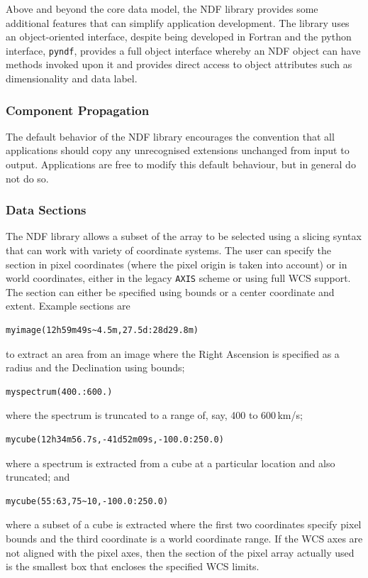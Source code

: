 \documentclass[final,authoryear,5p,times,twocolumn]{elsarticle}
\begin{document}
Above and beyond the core data model, the NDF library provides some
additional features that can simplify application development. The
library uses an object-oriented interface, despite being
developed in Fortran and the python interface, \texttt{pyndf}, provides a full object
interface whereby an NDF object can have methods invoked upon it and
provides direct access to object attributes such as dimensionality and
data label.

\subsubsection{Component Propagation}

The default behavior of the NDF library encourages the convention
that all applications should copy any unrecognised extensions
unchanged from input to output. Applications are free to modify this
default behaviour, but in general do not do so.

\subsubsection{Data Sections}

The NDF library allows a subset of the array to be selected using a
slicing syntax that can work with variety of coordinate systems. The
user can specify the section in pixel coordinates (where the pixel
origin is taken into account) or in world coordinates, either in the
legacy \texttt{AXIS} scheme or using full WCS support. The section can
either be specified using bounds or a center coordinate and
extent. Example sections are
\begin{verbatim}
myimage(12h59m49s~4.5m,27.5d:28d29.8m)
\end{verbatim}
to extract an area from an image where the Right Ascension is
specified as a radius and the Declination using bounds;
\begin{verbatim}
myspectrum(400.:600.)
\end{verbatim}
where the spectrum is truncated to a range of, say, 400 to 600\,km/s;
\begin{verbatim}
mycube(12h34m56.7s,-41d52m09s,-100.0:250.0)
\end{verbatim}
where a spectrum is extracted from a cube at a particular location and
also truncated; and
\begin{verbatim}
mycube(55:63,75~10,-100.0:250.0)
\end{verbatim}
where a subset of a cube is extracted where the first two coordinates
specify pixel bounds and the third coordinate is a world coordinate
range. If the WCS axes are not aligned with the pixel axes, then the
section of the pixel array actually used is the smallest box that
encloses the specified WCS limits.
\end{document}
